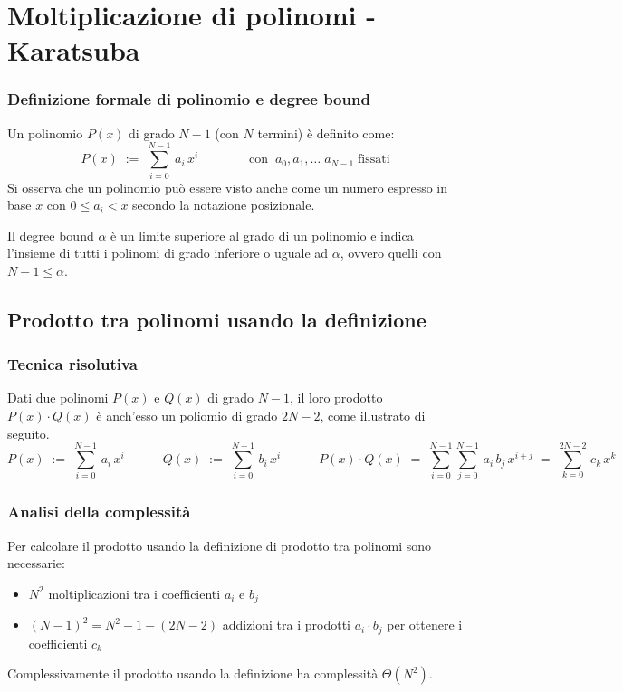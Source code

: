 
\section{Moltiplicazione di polinomi - Karatsuba}
\subsubsection*{Definizione formale di polinomio e degree bound}
Un polinomio \(P(x)\) di grado \(N-1\) (con \(N\) termini) è definito come:
\[P(x) \; := \; \sum_{i=0}^{N-1} \, a_i \, x^i \qquad\qquad \text{con} \;\; a_0, a_1, \dotsc \; a_{N-1} \; \text{fissati}\]
Si osserva che un polinomio può essere visto anche come un numero espresso in base \(x\) con \(0\leq a_i < x\) secondo la
notazione posizionale.

Il degree bound \(\alpha\) è un limite superiore al grado di un polinomio e indica l'insieme di tutti i polinomi di
grado inferiore o uguale ad \(\alpha\), ovvero quelli con \(N - 1 \leq \alpha\).

\subsection{Prodotto tra polinomi usando la definizione}
\subsubsection*{Tecnica risolutiva}
Dati due polinomi \(P(x)\) e \(Q(x)\) di grado \(N - 1\), il loro prodotto \(P(x) \cdot Q(x)\) è anch'esso un poliomio
di grado \(2N - 2\), come illustrato di seguito.
\[P(x) \; := \; \sum_{i=0}^{N-1} \, a_i \, x^i \qquad\quad Q(x) \; := \; \sum_{i=0}^{N-1} \, b_i \, x^i \qquad\quad P(x) \cdot Q(x) \; = \; \sum_{i=0}^{N-1} \sum_{j=0}^{N-1} \, a_i \, b_j \, x^{i+j} \; = \; \sum_{k=0}^{2N-2} \, c_k \, x^k\]

\subsubsection*{Analisi della complessità}
Per calcolare il prodotto usando la definizione di prodotto tra polinomi sono necessarie:
\begin{itemize}
	\item \(N^2\) moltiplicazioni tra i coefficienti \(a_i\) e \(b_j\)
	\item \((N-1)^2 = N^2 - 1 - (2N - 2)\) addizioni tra i prodotti \(a_i \cdot b_j\) per ottenere i coefficienti \(c_k\)
\end{itemize}
Complessivamente il prodotto usando la definizione ha complessità \(\Theta(N^2)\).

